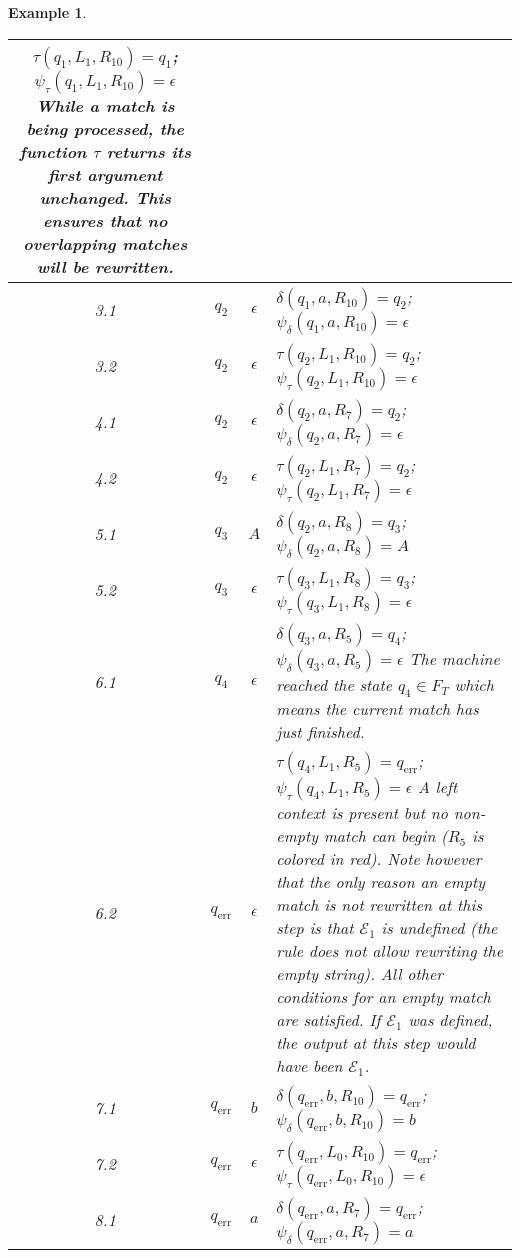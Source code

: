 \documentclass{article}
\newtheorem{example}[definition]{Example}
\begin{document}
\begin{example}
\begin{table}[h!]
\begin{adjustbox}{width=1.2\textwidth,center=\textwidth}
\begin{tabular}{c|c|c|p{130mm}}
					$\tau(q_1, L_1, R_{10})=q_1$; $\psi_\tau(q_1, L_1, R_{10})=\epsilon$ \newline
				While a match is being processed, the function $\tau$ returns its first argument unchanged. This ensures that no overlapping matches will be rewritten. \\ \hline
				3.1 & $q_2$ & $\epsilon$ & 
					$\delta(q_1, a, R_{10}) = q_2$; $\psi_\delta(q_1, a, R_{10}) = \epsilon$ \\ \hline
				3.2 & $q_2$ & $\epsilon$ &
					$\tau(q_2, L_1, R_{10})=q_2$; $\psi_\tau(q_2, L_1, R_{10})=\epsilon$ \\ \hline
				4.1 & $q_2$ & $\epsilon$ & 
					$\delta(q_2, a, R_7) = q_2$; $\psi_\delta(q_2, a, R_7) = \epsilon$ \\ \hline
				4.2 & $q_2$ & $\epsilon$ & 
					$\tau(q_2, L_1, R_7)=q_2$; $\psi_\tau(q_2, L_1, R_7)=\epsilon$ \\ \hline
				5.1 & $q_3$ & $A$ & 
					$\delta(q_2, a, R_8) = q_3$; $\psi_\delta(q_2, a, R_8) = A$ \\ \hline
				5.2 & $q_3$ & $\epsilon$ & 
					$\tau(q_3, L_1, R_8)=q_3$; $\psi_\tau(q_3, L_1, R_8)=\epsilon$ \\ \hline
				6.1 & $q_4$ & $\epsilon$ & 
					$\delta(q_3, a, R_5) = q_4$; $\psi_\delta(q_3, a, R_5) = \epsilon$ \newline
					The machine reached the state $q_4\in F_T$ which means the current match has just finished. \\ \hline
				6.2 & $q_\mathrm{err}$ & $\epsilon$ & 
					$\tau(q_4, L_1, R_5)=q_\mathrm{err}$; $\psi_\tau(q_4, L_1, R_5)=\epsilon$ \newline
					A left context is present but no non-empty match can begin ($R_5$ is colored in red).
					Note however that the only reason an empty match is not rewritten at this step is that $\mathcal{E}_1$ is undefined (the rule does not allow rewriting the empty string). All other conditions for an empty match are satisfied. If $\mathcal{E}_1$ was defined, the output at this step would have been $\mathcal{E}_1$. \\ \hline
				7.1 & $q_\mathrm{err}$ & $b$ & 
					$\delta(q_\mathrm{err}, b, R_{10}) = q_\mathrm{err}$; $\psi_\delta(q_\mathrm{err}, b, R_{10}) = b$ \\ \hline
				7.2 & $q_\mathrm{err}$ & $\epsilon$ & 
					$\tau(q_\mathrm{err}, L_0, R_{10})=q_\mathrm{err}$; $\psi_\tau(q_\mathrm{err}, L_0, R_{10})=\epsilon$ \\ \hline
				8.1 & $q_\mathrm{err}$ & $a$ & 
					$\delta(q_\mathrm{err}, a, R_7) = q_\mathrm{err}$; $\psi_\delta(q_\mathrm{err}, a, R_7) = a$ \\ \hline

\end{tabular}
\end{adjustbox}
\end{table}
\end{example}
\end{document}
